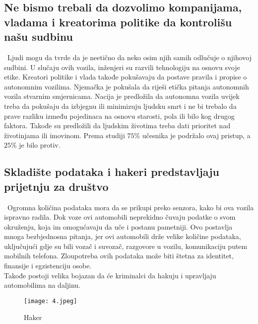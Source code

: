 \documentclass[a4paper]{article}
\begin{document}
{\subsection{Ne bismo trebali da dozvolimo kompanijama, vladama i kreatorima politike da kontrolišu našu sudbinu}
\label{subsec:ne bismo trebali da dozvolimo kompanijama, vladama i kreatorima politike da kontrolišu našu sudbinu}
\indent~Ljudi mogu da tvrde da je neetično da neko osim njih samih odlučuje o njihovoj sudbini. U slučaju ovih vozila, inženjeri su razvili tehnologiju na osnovu svoje etike. Kreatori politike i vlada takođe pokušavaju da postave pravila i propise o autonomnim vozilima. Njemačka je pokušala da riješi etička pitanja autonomnih vozila stvarnim smjernicama. Nacija je predložila da autonomna vozila uvijek treba da pokušaju da izbjegnu ili minimizuju ljudsku smrt i ne bi trebalo da prave razliku između pojedinaca na osnovu starosti, pola ili bilo kog drugog faktora. Takođe su predložili da ljudskim životima treba dati prioritet nad životinjama ili imovinom. Prema studiji  $75\%$  učesnika je podržalo ovaj pristup, a $25\%$  je bilo protiv.

\subsection{Skladište podataka i hakeri predstavljaju\\ prijetnju za društvo}
\label{subsec:skladište podataka i hakeri predstavljaju prijetnju za društvo}
\indent~Ogromna količina podataka mora da se prikupi preko senzora, kako bi ova vozila ispravno radila. Dok voze ovi automobili neprekidno čuvaju podatke o svom okruženju, koja im omogućavaju da uče i postanu pametniji. Ovo postavlja mnoga bezbjednosna pitanja, jer ovi automobili drže velike količine podataka, uključujući gdje su bili vozač i suvozač, razgovore u vozilu, komunikaciju putem mobilnih telefona. Zloupotreba ovih podataka može biti štetna za identitet, finansije  i egzistenciju osobe.\\
\indent Takođe postoji velika bojazan da će kriminalci da hakuju i upravljaju automobilima na daljinu.
\begin{figure}[!h]
\begin{center}
\texttt{[image: 4.jpeg]}
\label{1.1}
\caption{Haker}
\end{center}
\end{figure}
\newpage
}
\end{document}
